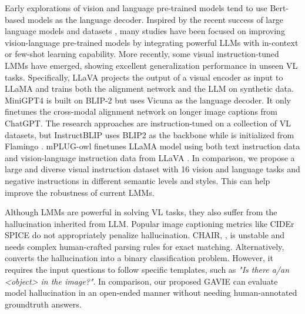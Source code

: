 Early explorations \citep{wang2022git, li2022blip,li2019visualbert, sun2019videobert} of vision and language pre-trained models tend to use Bert-based \citep{liu2019roberta, koroteev2021bert} models as the language decoder. Inspired by the recent success of large language models \citep{touvron2023llama, gilardi2023chatgpt, zhao2023survey, li2023towards, liu2023aligning} and datasets \citep{lin2014microsoft, changpinyo2021conceptual, krishna2017visual, liu2020visual, sharma2018conceptual, srinivasan2021wit, liu2023documentclip}, many studies \citep{alayrac2022flamingo, li2023blip, li2023otter} have been focused on improving vision-language pre-trained models by integrating powerful LLMs with in-context or few-shot learning capability. More recently, some visual instruction-tuned LMMs \citep{zhu2023minigpt, liu2023visual, gong2023multimodal, dai2023instructblip} have emerged, showing excellent generalization performance in unseen VL tasks. Specifically, LLaVA \citep{liu2023visual} projects the output of a visual encoder as input to LLaMA \citep{touvron2023llama} and trains both the alignment network and the LLM on synthetic data. MiniGPT4 \citep{zhu2023minigpt} is built on BLIP-2 but uses Vicuna \citep{chiang2023vicuna} as the language decoder. It only finetunes the cross-modal alignment network on longer image captions from ChatGPT. The research approaches \citep{gong2023multimodal, dai2023instructblip} are instruction-tuned on a collection of VL datasets, but InstructBLIP \citep{dai2023instructblip} uses BLIP2 \citep{li2023blip} as the backbone while \citep{gong2023multimodal} is initialized from Flamingo \citep{alayrac2022flamingo}. mPLUG-owl \citep{ye2023mplug} finetunes LLaMA \citep{touvron2023llama} model using both text instruction data and vision-language instruction data from LLaVA \citep{liu2023visual}. In comparison, we propose a large and diverse visual instruction dataset with 16 vision and language tasks and negative instructions in different semantic levels and styles. This can help improve the robustness of current LMMs.

Although LMMs are powerful in solving VL tasks, they also suffer from the hallucination  inherited from LLM. Popular image captioning metrics like CIDEr \citep{vedantam2015cider} SPICE \citep{anderson2016spice} do not appropriately penalize hallucination. CHAIR, \citep{rohrbach2018object}, is unstable and needs complex human-crafted parsing rules for exact matching. Alternatively, \citep{li2023evaluating} converts the hallucination into a binary classification problem. However, it requires the input questions to follow specific templates, such as \textit{"Is there a/an <object> in the image?"}. In comparison, our proposed GAVIE  can evaluate model hallucination in an  open-ended manner without needing human-annotated groundtruth answers.


